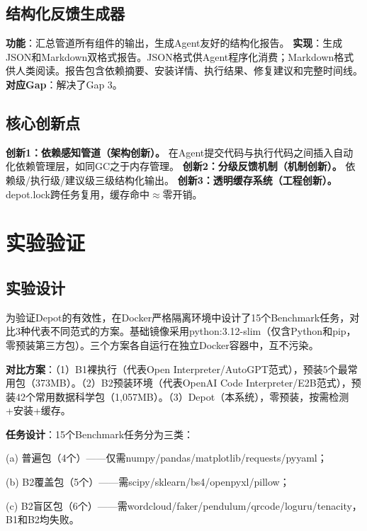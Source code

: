 \documentclass[10pt]{ctexart}
\begin{document}
\subsection{结构化反馈生成器}
\textbf{功能}：汇总管道所有组件的输出，生成Agent友好的结构化报告。
\textbf{实现}：生成JSON和Markdown双格式报告。JSON格式供Agent程序化消费；Markdown格式供人类阅读。报告包含依赖摘要、安装详情、执行结果、修复建议和完整时间线。
\textbf{对应Gap}：解决了Gap 3。

\subsection{核心创新点}
\textbf{创新1：依赖感知管道（架构创新）。} 在Agent提交代码与执行代码之间插入自动化依赖管理层，如同GC之于内存管理。
\textbf{创新2：分级反馈机制（机制创新）。} 依赖级/执行级/建议级三级结构化输出。
\textbf{创新3：透明缓存系统（工程创新）。} depot.lock跨任务复用，缓存命中$\approx$零开销。

\section{实验验证}

\subsection{实验设计}
为验证Depot的有效性，在Docker严格隔离环境中设计了15个Benchmark任务，对比3种代表不同范式的方案。基础镜像采用python:3.12-slim（仅含Python和pip，零预装第三方包）。三个方案各自运行在独立Docker容器中，互不污染\cite{merkel2014docker}。

\textbf{对比方案}：（1）B1裸执行（代表Open Interpreter/AutoGPT范式\cite{openinterpreter2023,autogpt2024}），预装5个最常用包（373MB）。（2）B2预装环境（代表OpenAI Code Interpreter/E2B范式\cite{openai2023code,e2b2024}），预装42个常用数据科学包（1,057MB）。（3）Depot（本系统），零预装，按需检测+安装+缓存。

\textbf{任务设计}：15个Benchmark任务分为三类：\par
\noindent\hspace{1em}
(a) 普遍包（4个）——仅需numpy/pandas/matplotlib/requests/pyyaml；\par
\noindent\hspace{1em}
(b) B2覆盖包（5个）——需scipy/sklearn/bs4/openpyxl/pillow；\par
\noindent\hspace{1em}
(c) B2盲区包（6个）——需wordcloud/faker/pendulum/qrcode/loguru/tenacity，B1和B2均失败。
\end{document}
